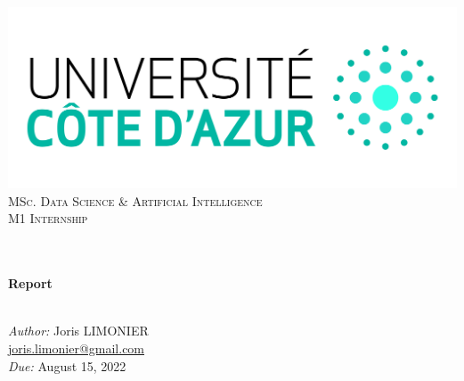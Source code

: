\begin{titlepage}
	\begin{center}
		\includegraphics[width=\textwidth]{images/logo_uca.jpeg}\\[0.1cm]
		\vspace{1.5cm}
		\textsc{\Large MSc. Data Science \& Artificial Intelligence}\\[1.2cm]
		\textsc{\Large M1 Internship}\\[1.2cm]
		\\
		\vspace{1cm}

		\HRule \\[0.6cm]
		{\huge \bfseries Report}\\[0.3cm]
		\HRule \\[1.8cm]
		\vfill

		\large
		\emph{Author:} Joris LIMONIER\\[.2cm]
		\href{mailto:joris.limonier@gmail.com}{\color{black}joris.limonier@gmail.com} \\[.2cm]
		\emph{Due:} {\large August 15, 2022}
	\end{center}
\end{titlepage}


